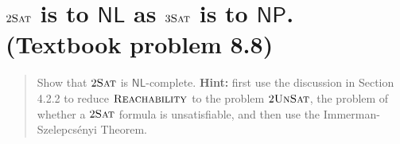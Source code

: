 

\maketitle
\thispagestyle{firststyle}
\vspace{-2.0cm}

\section{$2\textsc{Sat}$ is to $\mathsf{NL}$ as $3\textsc{Sat}$ is to $\mathsf{NP}$. (Textbook problem 8.8)}
\begin{quote}
      Show that $2\textsc{Sat}$ is $\mathsf{NL}$-complete.
      {\bf Hint:} first use the discussion in Section 4.2.2 to reduce
      $\textsc{Reachability}$ to the problem $2\textsc{UnSat}$,
      the problem of whether a $2\textsc{Sat}$ formula is unsatisfiable,
      and then use the Immerman-Szelepcs\'{e}nyi Theorem.
\end{quote}

